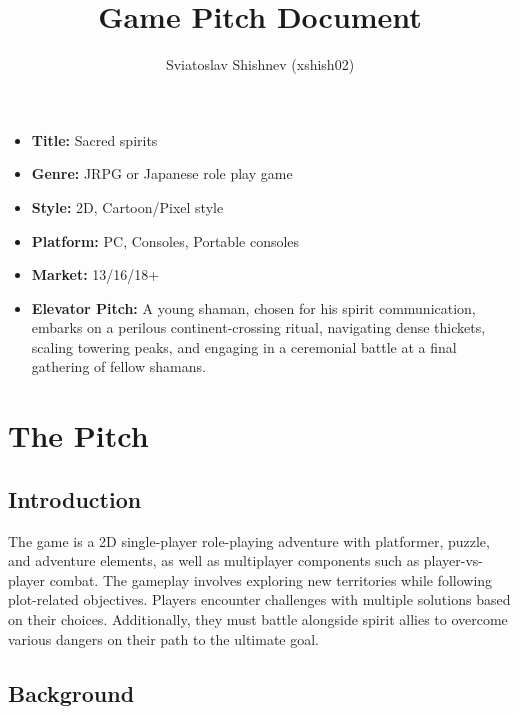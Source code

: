 \documentclass[a4paper,10pt,english]{article}
\title{%
Game Pitch Document%
}
\author{%
Sviatoslav Shishnev (xshish02)%
}
\date{}
\begin{document}
\maketitle
\thispagestyle{empty}

{%
\large

\begin{itemize}

\item[] \textbf{Title:} Sacred spirits

\item[] \textbf{Genre:} JRPG or Japanese role play game

\item[] \textbf{Style:} 2D, Cartoon/Pixel style

\item[] \textbf{Platform:} PC, Consoles, Portable consoles

\item[] \textbf{Market:} 13/16/18+

\item[] \textbf{Elevator Pitch:} A young shaman, chosen for his spirit communication, embarks on a perilous continent-crossing ritual, navigating dense thickets, scaling towering peaks, and engaging in a ceremonial battle at a final gathering of fellow shamans.

\end{itemize}

}

\section*{\centering The Pitch}

\subsection*{Introduction}
The game is a 2D single-player role-playing adventure with platformer, puzzle, and adventure elements, as well as multiplayer components such as player-vs-player combat. The gameplay involves exploring new territories while following plot-related objectives. Players encounter challenges with multiple solutions based on their choices. Additionally, they must battle alongside spirit allies to overcome various dangers on their path to the ultimate goal.

\subsection*{Background}
\end{document}
